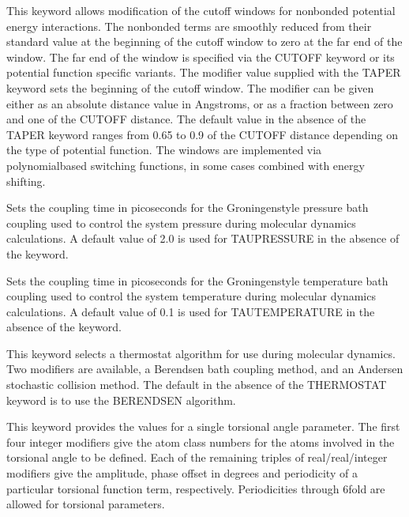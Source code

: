 \documentclass[letterpaper,11pt,english]{sphinxmanual}
\begin{document}
  This keyword allows modification of the cutoff windows for nonbonded potential energy interactions. The nonbonded terms are smoothly reduced from their standard value at the beginning of the cutoff window to zero at the far end of the window. The far end of the window is specified via the CUTOFF keyword or its potential function specific variants. The modifier value supplied with the TAPER keyword sets the beginning of the cutoff window. The modifier can be given either as an absolute distance value in Angstroms, or as a fraction between zero and one of the CUTOFF distance. The default value in the absence of the TAPER keyword ranges from 0.65 to 0.9 of the CUTOFF distance depending on the type of potential function. The windows are implemented via polynomial\sphinxhyphen{}based switching functions, in some cases combined with energy shifting.



  Sets the coupling time in picoseconds for the Groningen\sphinxhyphen{}style pressure bath coupling used to control the system pressure during molecular dynamics calculations. A default value of 2.0 is used for TAU\sphinxhyphen{}PRESSURE in the absence of the keyword.

  Sets the coupling time in picoseconds for the Groningen\sphinxhyphen{}style temperature bath coupling used to control the system temperature during molecular dynamics calculations. A default value of 0.1 is used for TAU\sphinxhyphen{}TEMPERATURE in the absence of the keyword.




  This keyword selects a thermostat algorithm for use during molecular dynamics. Two modifiers are available, a Berendsen bath coupling method, and an Andersen stochastic collision method. The default in the absence of the THERMOSTAT keyword is to use the BERENDSEN algorithm.


  This keyword provides the values for a single torsional angle parameter. The first four integer modifiers give the atom class numbers for the atoms involved in the torsional angle to be defined. Each of the remaining triples of real/real/integer modifiers give the amplitude, phase offset in degrees and periodicity of a particular torsional function term, respectively. Periodicities through 6\sphinxhyphen{}fold are allowed for torsional parameters.
\end{document}
